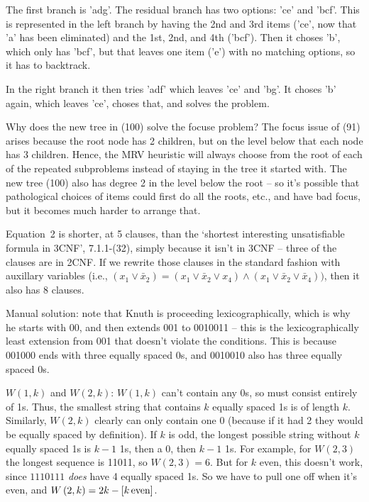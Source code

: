 The first branch is 'adg'.  The residual branch has two options: 'ce' and
'bcf'.  This is represented in the left branch by having the 2nd and 3rd
items ('ce', now that 'a' has been eliminated) and the 1st, 2nd, and 4th
('bcf').  Then it choses 'b', which only has 'bcf', but that leaves one
item ('e') with no matching options, so it has to backtrack.

In the right branch it then tries 'adf' which leaves 'ce' and 'bg'.
It choses 'b' again, which leaves 'ce', choses that, and solves the problem.


 Why does the new tree in (100) solve the focuse problem?
The focus issue of (91) arises because the root node has 2 children, but on
the level below that each node has 3 children.  Hence, the MRV heuristic will
always choose from the root of each of the repeated subproblems instead of 
staying in the tree it started with.  The new tree (100) also has degree 2
in the level below the root -- so it's possible that pathological choices
of items could first do all the roots, etc., and have bad focus, but it becomes
much harder to arrange that.


 Equation~2 is shorter, at 5 clauses, than the `shortest
interesting unsatisfiable formula in 3CNF', 7.1.1-(32), simply because it isn't
in 3CNF -- three of the clauses are in 2CNF.  If we rewrite those clauses in 
the standard fashion with auxillary variables (i.e., $\left(x_1 \vee {\bar x}_2 \right) =
\left(x_1 \vee {\bar x}_2 \vee x_4\right) \wedge \left(x_1 \vee {\bar x}_2 \vee {\bar x}_4\right))$,
then it also has 8 clauses.


 Manual solution: note that Knuth is proceeding lexicographically,
which is why he starts with 00, and then extends 001 to 0010011 -- this
is the lexicographically least extension from 001 that doesn't violate
the conditions.  This is because 001000 ends with three equally spaced 0s,
and 0010010 also has three equally spaced 0s.

 $W\left(1, k\right)$ and $W\left(2, k\right)$: $W\left(1,k\right)$
can't contain any 0s, so must consist entirely of 1s.  Thus, the smallest
string that contains $k$ equally spaced 1s is of length $k$.  
Similarly, $W\left(2, k\right)$ clearly can only contain one 0 (because
if it had 2 they would be equally spaced by definition).  If $k$
is odd, the longest possible string without $k$ equally spaced 1s 
is $k-1$ 1s, then a 0, then $k-1$ 1s.  For example, for
$W\left(2, 3\right)$ the longest sequence is 11011, so
$W\left(2, 3\right) = 6$.  But for $k$ even, this doesn't
work, since $1110111$ {\it does} have 4 equally spaced 1s.
So we have to pull one off when it's even, and
$W\left(2, k\right) = 2 k - \left[ k\, {\rm even} \right]$.

